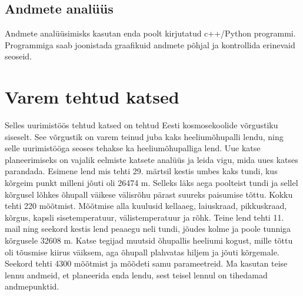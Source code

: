 \documentclass{trkut}%
\begin{document}
\subsection{Andmete analüüs}
Andmete analüüsimisks kasutan enda poolt kirjutatud c++/Python programmi. Programmiga saab joonistada graafikuid andmete põhjal ja kontrollida erinevaid seoseid.

\section{Varem tehtud katsed}
Selles uurimistöös tehtud katsed on tehtud Eesti kosmosekoolide võrgustiku siseselt. See võrgustik on varem teinud juba kaks heeliumõhupalli lendu, ning selle uurimistööga seoses tehakse ka heeliumõhupalliga lend. Uue katse planeerimiseks on vajalik eelmiste katsete analüüs ja leida vigu, mida uues katses parandada.
\newline Esimene lend mis tehti 29. märtsil kestis umbes kaks tundi, kus kõrgeim punkt milleni jõuti oli 26474 m. Selleks läks aega poolteist tundi ja sellel kõrgusel lõhkes õhupall väikese välisrõhu pärast suureks paisumise tõttu. Kokku tehti 220 mõõtmist. Mõõtmise alla kuulusid kellaaeg, laiuskraad, pikkuskraad, kõrgus, kapsli sisetemperatuur, välistemperatuur ja rõhk.
\newline Teine lend tehti 11. mail ning seekord kestis lend peaaegu neli tundi, jõudes kolme ja poole tunniga kõrgusele 32608 m. Katse tegijad muutsid õhupallis heeliumi kogust, mille tõttu oli tõusmise kiirus väiksem, aga õhupall plahvatas hiljem ja jõuti kõrgemale. Seekord tehti 4300 mõõtmist ja mõõdeti samu parameetreid.
\newline Ma kasutan teise lennu andmeid, et planeerida enda lendu, sest teisel lennul on tihedamad andmepunktid.
\end{document}

